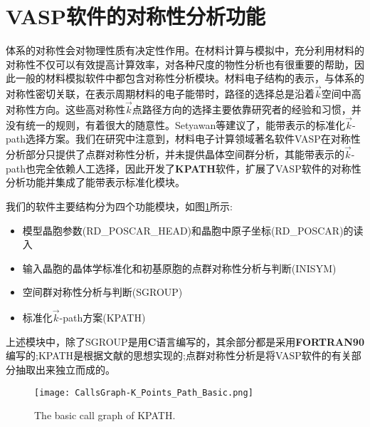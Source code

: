 \section{VASP软件的对称性分析功能}
体系的对称性会对物理性质有决定性作用。在材料计算与模拟中，充分利用材料的对称性不仅可以有效提高计算效率，对各种尺度的物性分析也有很重要的帮助，因此一般的材料模拟软件中都包含对称性分析模块。材料电子结构的表示，与体系的对称性密切关联，在表示周期材料的电子能带时，路径的选择总是沿着$\vec k$空间中高对称性方向。这些高对称性$\vec k$点路径方向的选择主要依靠研究者的经验和习惯，并没有统一的规则，有着很大的随意性。\textrm{Setyawan}等建议了，能带表示的标准化$\vec k$-\textrm{path}选择方案。我们在研究中注意到，材料电子计算领域著名软件\textrm{VASP}在对称性分析部分只提供了点群对称性分析，并未提供晶体空间群分析，其能带表示的$\vec k$-\textrm{path}也完全依赖人工选择，因此开发了\textbf{KPATH}软件，扩展了\textrm{VASP}软件的对称性分析功能并集成了能带表示标准化模块。

我们的软件主要结构分为四个功能模块，如图\ref{Call_graph:basic}所示:
\begin{itemize}
	\item 模型晶胞参数(\textrm{RD\_POSCAR\_HEAD})和晶胞中原子坐标(\textrm{RD\_POSCAR})的读入
	\item 输入晶胞的晶体学标准化和初基原胞的点群对称性分析与判断(\textrm{INISYM})
	\item 空间群对称性分析与判断(SGROUP)
	\item 标准化$\vec k$-\textrm{path}方案(\textrm{KPATH})
\end{itemize}
上述模块中，除了\textrm{SGROUP}是用\textbf{C}语言编写的，其余部分都是采用\textbf{FORTRAN90}编写的;\textrm{KPATH}是根据文献\cite{CMS49-299_2010}的思想实现的;点群对称性分析是将\textrm{VASP}软件的有关部分抽取出来独立而成的。
\begin{figure}[h!]
\centering
\texttt{[image: CallsGraph-K\_Points\_Path\_Basic.png]}
\caption{\small The basic call graph of KPATH.}%
\label{Call_graph:basic}
\end{figure}

